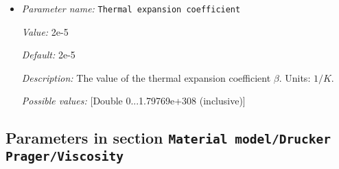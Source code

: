 \begin{itemize}
{\it Value:} 4.7


{\it Default:} 4.7


{\it Description:} The value of the thermal conductivity $k$. Units: $W/m/K$.


{\it Possible values:} [Double 0...1.79769e+308 (inclusive)]
\item {\it Parameter name:} {\tt Thermal expansion coefficient}
\label{parameters:Material model/Drucker Prager/Thermal expansion coefficient}


{\it Value:} 2e-5


{\it Default:} 2e-5


{\it Description:} The value of the thermal expansion coefficient $\beta$. Units: $1/K$.


{\it Possible values:} [Double 0...1.79769e+308 (inclusive)]
\end{itemize}



\subsection{Parameters in section \tt Material model/Drucker Prager/Viscosity}
\label{parameters:Material_20model/Drucker_20Prager/Viscosity}

